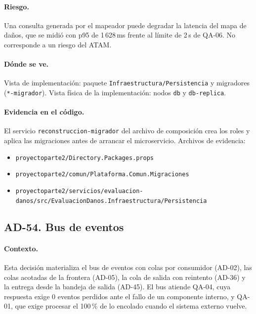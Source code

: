 \paragraph{Riesgo.} Una consulta generada por el mapeador puede degradar la latencia del mapa de daños, que se midió con p95 de 1\,628\,ms frente al límite de 2\,s de QA-06.
No corresponde a un riesgo del ATAM.

\paragraph{Dónde se ve.} Vista de implementación: paquete \texttt{Infraestructura/Persistencia} y migradores (\texttt{*-migrador}).
Vista física de la implementación: nodos \texttt{db} y \texttt{db-replica}.

\paragraph{Evidencia en el código.} El servicio \texttt{reconstruccion-migrador} del archivo de composición crea los roles y aplica las migraciones antes de arrancar el microservicio.
Archivos de evidencia:
{\raggedright
\begin{itemize}
  \item \texttt{proyectoparte2/\br{}Directory.Packages.props}
  \item \texttt{proyectoparte2/\br{}comun/\br{}Plataforma.Comun.Migraciones}
  \item \texttt{proyectoparte2/\br{}servicios/\br{}evaluacion-danos/\br{}src/\br{}EvaluacionDanos.Infraestructura/\br{}Persistencia}
\end{itemize}
\par}

\subsection{AD-54. Bus de eventos}
\label{sec:tec-ad54}

\paragraph{Contexto.} Esta decisión materializa el bus de eventos con colas por consumidor (AD-02), las colas acotadas de la frontera (AD-05), la cola de salida con reintento (AD-36) y la entrega desde la bandeja de salida (AD-45).
El bus atiende QA-04, cuya respuesta exige 0 eventos perdidos ante el fallo de un componente interno, y QA-01, que exige procesar el 100\,\% de lo encolado cuando el sistema externo vuelve.

